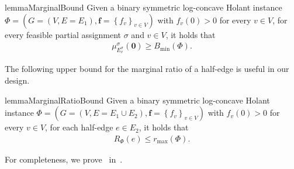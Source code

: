 \documentclass[11pt]{article}
\newtheorem{lemma}[theorem]{Lemma}
\newtheorem*{remark}{Remark}
\newcommand{\set}[1]{\left\{#1\right\}}
\newcommand{\defeq}{\triangleq} \renewcommand{\d}{\,\-d}
\newcommand{\zero}{\boldsymbol{0}}
\newcommand{\vecf}{\boldsymbol{f}}
\newcommand{\zdtodo}[1]{\todo[color = blue!40, size = \tiny]{\textbf{zhidan:} #1}}
\newcommand{\qgl}[1]{{\color{purple}{#1}}}
\newcommand{\zdnew}[1]{{\color{cyan} #1}}
\begin{document}
\begin{restatable}{lemma}{MarginalBound} \label{lem:marginal-bound}
    Given a binary symmetric log-concave Holant instance $\Phi = \left(G = (V, E = E_1), \vecf = \set{f_v}_{v \in V}\right)$ with $f_v(0) > 0$ for every $v \in V$, for every feasible partial assignment $\sigma$ and $v \in V$, it holds that
    \begin{align} \label{eq:marginal-bound}
        \mu_{E_v^\sigma}^{\sigma}(\zero) \ge B_{\min}(\Phi).
    \end{align}
\end{restatable}



The following upper bound for the marginal ratio of a half-edge is useful in our design.
\begin{restatable}{lemma}{MarginalRatioBound} \label{lem:marginal-ratio-upper-bound}
     Given a binary symmetric log-concave Holant instance $\Phi = \left(G = (V, E = E_1 \cup E_2), \vecf = \set{f_v}_{v \in V}\right)$ with $f_v(0) > 0$ for every $v \in V$, for each half-edge $e \in E_2$, it holds that
    \begin{align*}
        R_{\Phi}(e) \le r_{\max}(\Phi).
    \end{align*}
\end{restatable}
For completeness, we prove~ in~.
\end{document}
